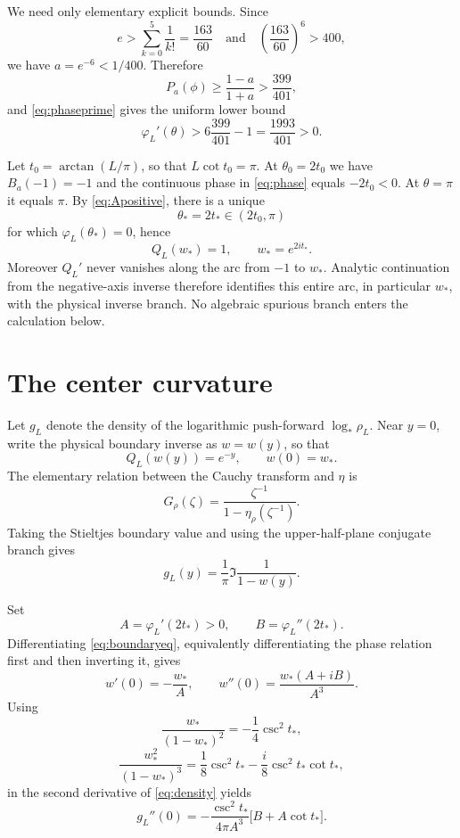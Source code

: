 \documentclass[11pt]{article}
\begin{document}
We need only elementary explicit bounds.  Since
\[
 e>\sum_{k=0}^5\frac1{k!}=\frac{163}{60}
 \quad\text{and}\quad
 \left(\frac{163}{60}\right)^6>400,
\]
we have $a=e^{-6}<1/400$.  Therefore
\[
 P_a(\phi)\geq\frac{1-a}{1+a}>\frac{399}{401},
\]
and \eqref{eq:phaseprime} gives the uniform lower bound
\begin{equation}\label{eq:Apositive}
 \varphi_L'(\theta)>
 6\frac{399}{401}-1=\frac{1993}{401}>0.
\end{equation}

Let $t_0=\arctan(L/\pi)$, so that $L\cot t_0=\pi$.  At
$\theta_0=2t_0$ we have $B_a(-1)=-1$ and the continuous phase in
\eqref{eq:phase} equals $-2t_0<0$.  At $\theta=\pi$ it equals $\pi$.
By \eqref{eq:Apositive}, there is a unique
\[
 \theta_*=2t_*\in(2t_0,\pi)
\]
for which $\varphi_L(\theta_*)=0$, hence
\begin{equation}\label{eq:centerroot}
 Q_L(w_*)=1,\qquad w_*=e^{2it_*}.
\end{equation}
Moreover $Q_L'$ never vanishes along the arc from $-1$ to $w_*$.  Analytic
continuation from the negative-axis inverse therefore identifies this entire
arc, in particular $w_*$, with the physical inverse branch.  No algebraic
spurious branch enters the calculation below.

\section{The center curvature}

Let $g_L$ denote the density of the logarithmic push-forward
$\log_*\rho_L$.  Near $y=0$, write the physical boundary inverse as $w=w(y)$,
so that
\begin{equation}\label{eq:boundaryeq}
 Q_L(w(y))=e^{-y},\qquad w(0)=w_*.
\end{equation}
The elementary relation between the Cauchy transform and $\eta$ is
\[
 G_\rho(\zeta)=\frac{\zeta^{-1}}{1-\eta_\rho(\zeta^{-1})}.
\]
Taking the Stieltjes boundary value and using the upper-half-plane conjugate
branch gives
\begin{equation}\label{eq:density}
 g_L(y)=\frac1\pi\Im\frac{1}{1-w(y)}.
\end{equation}

Set
\[
 A=\varphi_L'(2t_*)>0,
 \qquad
 B=\varphi_L''(2t_*).
\]
Differentiating \eqref{eq:boundaryeq}, equivalently differentiating the phase
relation first and then inverting it, gives
\[
 w'(0)=-\frac{w_*}{A},
 \qquad
 w''(0)=\frac{w_*(A+iB)}{A^3}.
\]
Using
\[
 \frac{w_*}{(1-w_*)^2}=-\frac14\csc^2t_*,
\]
\[
 \frac{w_*^2}{(1-w_*)^3}
 =\frac18\csc^2t_*
  -\frac{i}{8}\csc^2t_*\cot t_*,
\]
in the second derivative of \eqref{eq:density} yields
\begin{equation}\label{eq:gsecond}
 g_L''(0)
 =-\frac{\csc^2t_*}{4\pi A^3}
   \bigl[B+A\cot t_*\bigr].
\end{equation}
\end{document}
